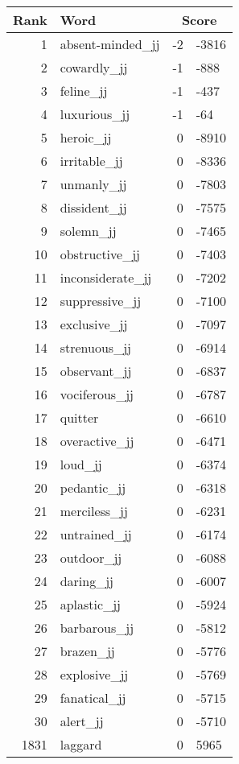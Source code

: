 \begin{longtable}[!htbp]{| rlr@{.}l |}
    \hline
    \textbf{Rank} & \textbf{Word} & \multicolumn{2}{c|}{\textbf{Score}} \\
    \hline
    \endhead
    1 & absent-minded\_jj & -2 & -3816 \\
    2 & cowardly\_jj & -1 & -888 \\
    3 & feline\_jj & -1 & -437 \\
    4 & luxurious\_jj & -1 & -64 \\
    5 & heroic\_jj & 0 & -8910 \\
    6 & irritable\_jj & 0 & -8336 \\
    7 & unmanly\_jj & 0 & -7803 \\
    8 & dissident\_jj & 0 & -7575 \\
    9 & solemn\_jj & 0 & -7465 \\
    10 & obstructive\_jj & 0 & -7403 \\
    11 & inconsiderate\_jj & 0 & -7202 \\
    12 & suppressive\_jj & 0 & -7100 \\
    13 & exclusive\_jj & 0 & -7097 \\
    14 & strenuous\_jj & 0 & -6914 \\
    15 & observant\_jj & 0 & -6837 \\
    16 & vociferous\_jj & 0 & -6787 \\
    17 & quitter & 0 & -6610 \\
    18 & overactive\_jj & 0 & -6471 \\
    19 & loud\_jj & 0 & -6374 \\
    20 & pedantic\_jj & 0 & -6318 \\
    21 & merciless\_jj & 0 & -6231 \\
    22 & untrained\_jj & 0 & -6174 \\
    23 & outdoor\_jj & 0 & -6088 \\
    24 & daring\_jj & 0 & -6007 \\
    25 & aplastic\_jj & 0 & -5924 \\
    26 & barbarous\_jj & 0 & -5812 \\
    27 & brazen\_jj & 0 & -5776 \\
    28 & explosive\_jj & 0 & -5769 \\
    29 & fanatical\_jj & 0 & -5715 \\
    30 & alert\_jj & 0 & -5710 \\
    1831 & laggard & 0 & 5965 \\

\end{longtable}
